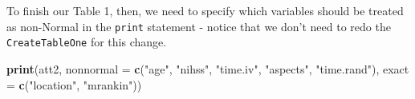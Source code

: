\documentclass[]{book}
\newenvironment{Shaded}{\begin{snugshade}}{\end{snugshade}}
\newcommand{\KeywordTok}[1]{\textcolor[rgb]{0.13,0.29,0.53}{\textbf{#1}}}
\newcommand{\DataTypeTok}[1]{\textcolor[rgb]{0.13,0.29,0.53}{#1}}
\newcommand{\StringTok}[1]{\textcolor[rgb]{0.31,0.60,0.02}{#1}}
\newcommand{\NormalTok}[1]{#1}
\theoremstyle{definition}
\theoremstyle{definition}
\theoremstyle{definition}
\theoremstyle{remark}
\begin{document}
To finish our Table 1, then, we need to specify which variables should
be treated as non-Normal in the \texttt{print} statement - notice that
we don't need to redo the \texttt{CreateTableOne} for this change.

\begin{Shaded}
\begin{Highlighting}[]
\KeywordTok{print}\NormalTok{(att2, }
      \DataTypeTok{nonnormal =} \KeywordTok{c}\NormalTok{(}\StringTok{"age"}\NormalTok{, }\StringTok{"nihss"}\NormalTok{, }\StringTok{"time.iv"}\NormalTok{, }\StringTok{"aspects"}\NormalTok{, }\StringTok{"time.rand"}\NormalTok{),}
      \DataTypeTok{exact =} \KeywordTok{c}\NormalTok{(}\StringTok{"location"}\NormalTok{, }\StringTok{"mrankin"}\NormalTok{))}
\end{Highlighting}
\end{Shaded}
\end{document}
